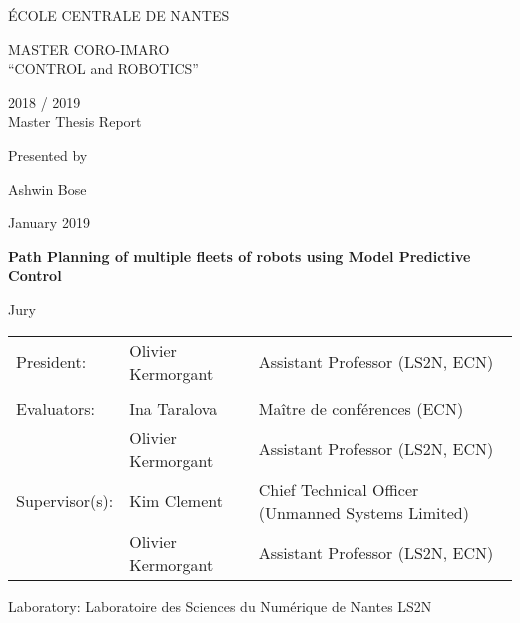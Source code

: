 \thispagestyle{empty}

\def\lskip{\vspace{0.5cm}}



\begin{center}
	ÉCOLE CENTRALE DE NANTES
\end{center}
\vspace{2cm}

\begin{center} \large\sc MASTER CORO-IMARO\\ \normalsize{``CONTROL and ROBOTICS''} \end{center}



\begin{center}
	2018 / 2019\\
	\lskip
	Master Thesis Report
	\lskip
	
	Presented by \lskip 
	
	Ashwin Bose \lskip
	
	January 2019 \lskip\lskip
	
	{\Large \textbf{Path Planning of multiple fleets of robots using Model Predictive Control}}
	
	\vfill

Jury \lskip
		
	\end{center}
	


\begin{tabular}{p{3cm}p{7cm}p{5cm} }
 President: &Olivier Kermorgant  & Assistant Professor (LS2N, ECN) \\ & & \\ 
 Evaluators: & Ina Taralova & Maître de conférences (ECN) \\
			&Olivier Kermorgant & Assistant Professor (LS2N, ECN)\\ 
  Supervisor(s):  & Kim Clement & Chief Technical Officer (Unmanned Systems Limited) \\
		  &Olivier Kermorgant & Assistant Professor (LS2N, ECN)\\
\end{tabular}

\lskip

\begin{flushleft}
 Laboratory: Laboratoire des Sciences du Numérique de Nantes LS2N
\end{flushleft}

\newpage
\thispagestyle{empty}
\null
\newpage
\addtocounter{page}{-1}
\pagestyle{fancy}
